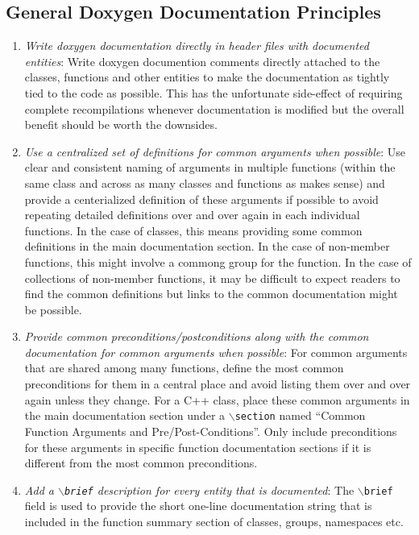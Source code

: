 %
\subsection{General Doxygen Documentation Principles}
%

\begin{enumerate}

{}\item\textit{Write doxygen documentation directly in header files with
documented entities}: Write doxygen documention comments directly attached to
the classes, functions and other entities to make the documentation as tightly
tied to the code as possible.  This has the unfortunate side-effect of
requiring complete recompilations whenever documentation is modified but the
overall benefit should be worth the downsides.

{}\item\textit{Use a centralized set of definitions for common arguments when
possible}: Use clear and consistent naming of arguments in multiple functions
(within the same class and across as many classes and functions as makes
sense) and provide a centerialized definition of these arguments if possible
to avoid repeating detailed definitions over and over again in each individual
functions.  In the case of classes, this means providing some common
definitions in the main documentation section.  In the case of non-member
functions, this might involve a commong group for the function.  In the case
of collections of non-member functions, it may be difficult to expect readers
to find the common definitions but links to the common documentation might be
possible.

{}\item\textit{Provide common preconditions/postconditions along with the
common documentation for common arguments when possible}: For common arguments
that are shared among many functions, define the most common preconditions for
them in a central place and avoid listing them over and over again unless they
change.  For a C++ class, place these common arguments in the main
documentation section under a {}\texttt{$\backslash$section} named ``Common
Function Arguments and Pre/Post-Conditions''.  Only include preconditions for
these arguments in specific function documentation sections if it is different
from the most common preconditions.

{}\item\textit{Add a {}\texttt{$\backslash$brief} description for every entity
that is documented}: The {}\texttt{$\backslash$brief} field is used to provide
the short one-line documentation string that is included in the function
summary section of classes, groups, namespaces etc.


\end{enumerate}

